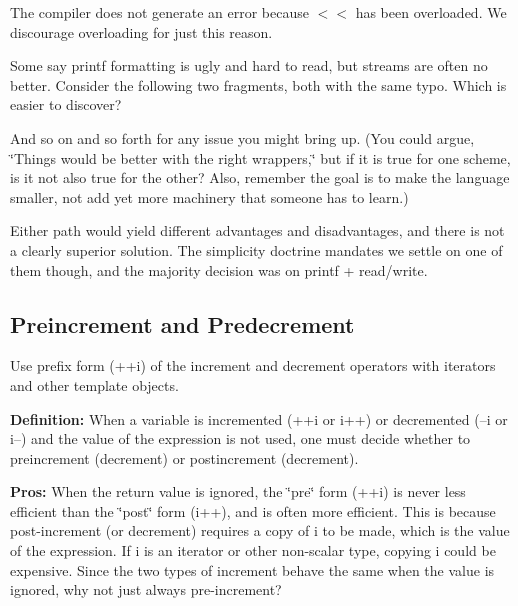 The compiler does not generate an error because $<$$<$ has been overloaded. We discourage overloading for just this reason.

Some say {\ttfamily printf} formatting is ugly and hard to read, but streams are often no better. Consider the following two fragments, both with the same typo. Which is easier to discover?




And so on and so forth for any issue you might bring up. (You could argue, \char`\"{}\+Things would be better with the right wrappers,\char`\"{} but if it is true for one scheme, is it not also true for the other? Also, remember the goal is to make the language smaller, not add yet more machinery that someone has to learn.)

Either path would yield different advantages and disadvantages, and there is not a clearly superior solution. The simplicity doctrine mandates we settle on one of them though, and the majority decision was on printf + read/write.

\subsection*{Preincrement and Predecrement}

Use prefix form (++i) of the increment and decrement operators with iterators and other template objects.

{\bfseries Definition\+:} When a variable is incremented (++i or i++) or decremented (--i or i--) and the value of the expression is not used, one must decide whether to preincrement (decrement) or postincrement (decrement).

{\bfseries Pros\+:} When the return value is ignored, the \char`\"{}pre\char`\"{} form (++i) is never less efficient than the \char`\"{}post\char`\"{} form (i++), and is often more efficient. This is because post-\/increment (or decrement) requires a copy of i to be made, which is the value of the expression. If i is an iterator or other non-\/scalar type, copying i could be expensive. Since the two types of increment behave the same when the value is ignored, why not just always pre-\/increment?

